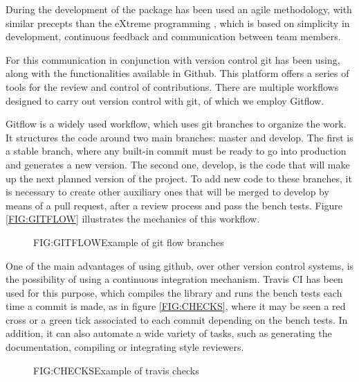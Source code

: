 During the development of the package has been used an agile methodology, with
similar precepts than the eXtreme programming \cite{eXtreme}, which is based on
simplicity in development, continuous feedback and communication between
team members.

For this communication in conjunction with version control git has been using,
along with the functionalities available in Github. This platform offers a
series of tools for the review and control of contributions. There are multiple
workflows designed to carry out version control with git, of which we employ
Gitflow.

Gitflow is a widely used workflow, which uses git branches to organize the work.
It structures the code around two main branches: master and develop. The first
is a stable branch, where any built-in commit must be ready to go into
production and generates a new version. The second one, develop, is the code
that will make up the next planned version of the project. To add new code to
these branches, it is necessary to create other auxiliary ones that will be
merged to develop by means of a pull request, after a review process and pass
the bench tests. Figure \ref{FIG:GITFLOW} illustrates the mechanics of this
workflow.


\begin{figure}[Example of git flow branches]{FIG:GITFLOW}{Example of git flow branches \footnotemark}
\end{figure}


One of the main advantages of using github, over other version control systems,
is the possibility of using a continuous integration mechanism. Travis CI has
been used for this purpose, which compiles the library and runs the bench tests
each time a commit is made, as in figure \ref{FIG:CHECKS}, where it may be seen a red cross
or a green tick associated to each commit depending on the bench tests. In
addition, it can also automate a wide variety of tasks, such as generating the
documentation, compiling or integrating style reviewers.

\begin{figure}[Example of travis checks]{FIG:CHECKS}{Example of travis checks}
\end{figure}
